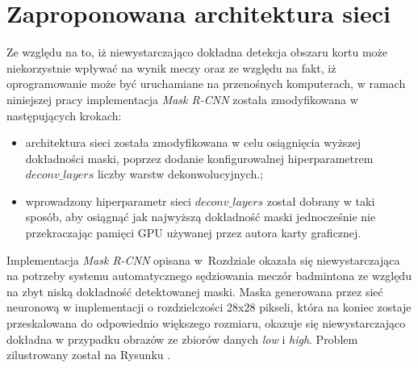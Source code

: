 \newpage
\section{Zaproponowana architektura sieci}
\label{sec:zaproponowana_architektura}

Ze względu na to, iż niewystarczająco dokładna detekcja obszaru kortu może niekorzystnie wpływać na wynik meczy oraz ze względu na fakt, iż oprogramowanie może być uruchamiane na przenośnych komputerach, w ramach niniejszej pracy implementacja \textit{Mask R-CNN} została zmodyfikowana w następujących krokach:

\begin{itemize}
	\item architektura sieci została zmodyfikowana w celu osiągnięcia wyższej dokładności maski, poprzez dodanie konfigurowalnej hiperparametrem $deconv\_layers$ liczby warstw dekonwolucyjnych.;
	\item wprowadzony hiperparametr sieci $deconv\_layers$ został dobrany w taki sposób, aby osiągnąć jak najwyższą dokładność maski jednocześnie nie przekraczając pamięci GPU używanej przez autora karty graficznej.
\end{itemize}

Implementacja \textit{Mask R-CNN} opisana w~Rozdziale  okazała się niewystarczająca na potrzeby systemu automatycznego sędziowania meczór badmintona ze względu na zbyt niską dokładność detektowanej maski.
Maska generowana przez sieć neuronową w implementacji \cite{matterport-mask-rcnn} o rozdzielczości 28x28 pikseli, która na koniec zostaje przeskalowana do odpowiednio większego rozmiaru, okazuje się niewystarczająco dokładna w przypadku obrazów ze zbiorów danych \textit{low} i \textit{high}.
Problem zilustrowany został na Rysunku . 

